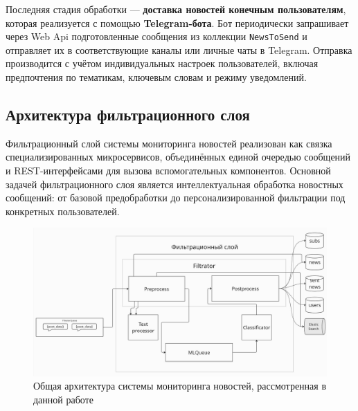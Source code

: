 Последняя стадия обработки — \textbf{доставка новостей конечным пользователям}, которая реализуется с помощью \textbf{Telegram-бота}.
Бот периодически запрашивает через Web Api подготовленные сообщения из коллекции \texttt{NewsToSend} и отправляет их в соответствующие каналы или личные чаты в Telegram.
Отправка производится с учётом индивидуальных настроек пользователей, включая предпочтения по тематикам, ключевым словам и режиму уведомлений.

\subsection{Архитектура фильтрационного слоя}\label{subsec:filtersloy}
Фильтрационный слой системы мониторинга новостей реализован как связка специализированных микросервисов, объединённых единой очередью сообщений и REST-интерфейсами для вызова вспомогательных компонентов.
Основной задачей фильтрационного слоя является интеллектуальная обработка новостных сообщений: от базовой предобработки до персонализированной фильтрации под конкретных пользователей.

\begin{figure}[H]
    \centering
    \includegraphics[width=150mm]{images/filter_process}
    \caption{Общая архитектура системы мониторинга новостей, рассмотренная в данной работе}
    \label{fig:filter_process}
\end{figure}

